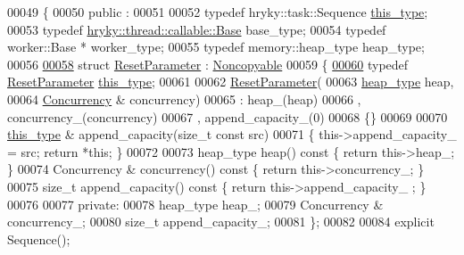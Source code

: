 \begin{DoxyCode}
00049 \{
00050 \textcolor{keyword}{public} :
00051 
00052     \textcolor{keyword}{typedef} hryky::task::Sequence           \hyperlink{classhryky_1_1_noncopyable_acf13ad1c98a76247a561dff514979da5}{this_type};
00053     \textcolor{keyword}{typedef} \hyperlink{classhryky_1_1thread_1_1callable_1_1_base}{hryky::thread::callable::Base}   base\_type;
00054     \textcolor{keyword}{typedef} worker::Base *                  worker\_type;
00055     \textcolor{keyword}{typedef} memory::heap\_type               heap\_type;
00056 
\hypertarget{task__sequence_8h_source_l00058}{}\hyperlink{structhryky_1_1task_1_1_sequence_1_1_reset_parameter}{00058}     \textcolor{keyword}{struct }\hyperlink{structhryky_1_1task_1_1_sequence_1_1_reset_parameter}{ResetParameter} : \hyperlink{classhryky_1_1_noncopyable}{Noncopyable}
00059     \{
\hypertarget{task__sequence_8h_source_l00060}{}\hyperlink{structhryky_1_1task_1_1_sequence_1_1_reset_parameter_a2edf3eb894e141dc65a6e3dacf004b8e}{00060}         \textcolor{keyword}{typedef} \hyperlink{structhryky_1_1task_1_1_sequence_1_1_reset_parameter}{ResetParameter}          \hyperlink{structhryky_1_1task_1_1_sequence_1_1_reset_parameter_a2edf3eb894e141dc65a6e3dacf004b8e}{this_type};
00061         
00062         \hyperlink{structhryky_1_1task_1_1_sequence_1_1_reset_parameter}{ResetParameter}(
00063             \hyperlink{classhryky_1_1memory_1_1heap_1_1_base}{heap_type} heap,
00064             \hyperlink{classhryky_1_1task_1_1_concurrency}{Concurrency} & concurrency)
00065             : heap\_(heap)
00066               , concurrency\_(concurrency)
00067               , append\_capacity\_(0)
00068         \{\}
00069 
00070         \hyperlink{classhryky_1_1_noncopyable}{this_type} & append\_capacity(\textcolor{keywordtype}{size\_t} \textcolor{keyword}{const} src)
00071         \{ this->append\_capacity\_ = src; \textcolor{keywordflow}{return} *\textcolor{keyword}{this}; \}
00072 
00073         heap\_type       heap()\textcolor{keyword}{ const }\{ \textcolor{keywordflow}{return} this->heap\_; \}
00074         Concurrency &   concurrency()\textcolor{keyword}{ const }\{ \textcolor{keywordflow}{return} this->concurrency\_; \}
00075         \textcolor{keywordtype}{size\_t}          append\_capacity()\textcolor{keyword}{ const }\{ \textcolor{keywordflow}{return} this->append\_capacity\_
      ; \}
00076 
00077     \textcolor{keyword}{private}:
00078         heap\_type       heap\_;
00079         Concurrency &   concurrency\_;
00080         \textcolor{keywordtype}{size\_t}          append\_capacity\_;
00081     \};
00082 
00084     \textcolor{keyword}{explicit} Sequence();

\end{DoxyCode}
